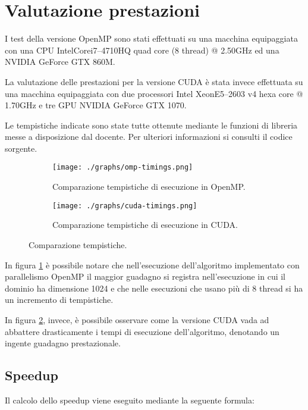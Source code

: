 \section{Valutazione prestazioni}

I test della versione OpenMP sono stati effettuati su una macchina equipaggiata
con una CPU Intel\textregistered\@ Core\texttrademark\@ i7--4710HQ quad core (8
thread) @ 2.50GHz ed una NVIDIA GeForce GTX 860M.

La valutazione delle prestazioni per la versione CUDA è stata invece effettuata
su una macchina equipaggiata con due processori Intel\textregistered\@
Xeon\textregistered\@ E5--2603 v4 hexa core @ 1.70GHz e tre GPU NVIDIA GeForce
GTX 1070.

Le tempistiche indicate sono state tutte ottenute mediante le funzioni di
libreria messe a disposizione dal docente. Per ulteriori informazioni si
consulti il codice sorgente.

\begin{figure}[!ht]
  \centering
  \begin{subfigure}[b]{0.49\linewidth}
  \texttt{[image: ./graphs/omp-timings.png]}
  \caption{Comparazione tempistiche di esecuzione in
  OpenMP.}\label{fig:timingsomp1}
  \end{subfigure}
  \begin{subfigure}[b]{0.5\linewidth}
  \texttt{[image: ./graphs/cuda-timings.png]}
  \caption{Comparazione tempistiche di esecuzione in
  CUDA.}\label{fig:timingscuda1}
  \end{subfigure}
  \caption{Comparazione tempistiche.}\label{fig:timings}
\end{figure}

In figura \ref{fig:timingsomp1} è possibile notare che nell'esecuzione
dell'algoritmo implementato con parallelismo OpenMP il maggior guadagno si
registra nell'esecuzione in cui il dominio ha dimensione 1024 e che nelle
esecuzioni che usano più di 8 thread si ha un incremento di tempistiche.

In figura \ref{fig:timingscuda1}, invece, è possibile osservare come la versione
CUDA vada ad abbattere drasticamente i tempi di esecuzione dell'algoritmo,
denotando un ingente guadagno prestazionale.

\subsection{Speedup}

Il calcolo dello speedup viene eseguito mediante la seguente formula:

